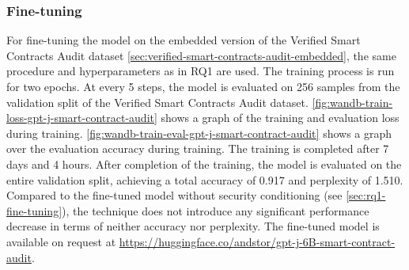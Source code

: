 \subsubsection{Fine-tuning}
For fine-tuning the model on the embedded version of the Verified Smart Contracts Audit dataset \cref{sec:verified-smart-contracts-audit-embedded}, the same procedure and hyperparameters as in RQ1 \label{sec:rq1-fine-tuning} are used. The training process is run for two epochs. At every 5 steps, the model is evaluated on 256 samples from the validation split of the Verified Smart Contracts Audit dataset. \cref{fig:wandb-train-loss-gpt-j-smart-contract-audit} shows a graph of the training and evaluation loss during training. \cref{fig:wandb-train-eval-gpt-j-smart-contract-audit} shows a graph over the evaluation accuracy during training. The training is completed after 7 days and 4 hours. After completion of the training, the model is evaluated on the entire validation split, achieving a total accuracy of 0.917 and perplexity of 1.510. Compared to the fine-tuned model without security conditioning (see \cref{sec:rq1-fine-tuning}), the technique does not introduce any significant performance decrease in terms of neither accuracy nor perplexity. The fine-tuned model is available on request at \url{https://huggingface.co/andstor/gpt-j-6B-smart-contract-audit}.

